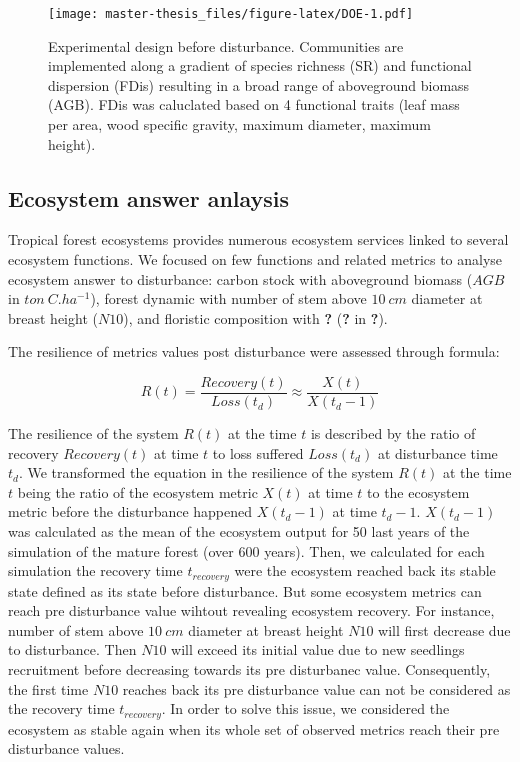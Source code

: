 \documentclass[]{article}
\theoremstyle{definition}
\theoremstyle{definition}
\theoremstyle{remark}
\begin{document}
\begin{figure}[htbp]
\centering
\texttt{[image: master-thesis\_files/figure-latex/DOE-1.pdf]}
\caption{\label{fig:DOE}Experimental design before disturbance. Communities
are implemented along a gradient of species richness (SR) and functional
dispersion (FDis) resulting in a broad range of aboveground biomass
(AGB). FDis was caluclated based on 4 functional traits (leaf mass per
area, wood specific gravity, maximum diameter, maximum height).}
\end{figure}

\subsection{Ecosystem answer anlaysis}\label{ecosystem-answer-anlaysis}

Tropical forest ecosystems provides numerous ecosystem services linked
to several ecosystem functions. We focused on few functions and related
metrics to analyse ecosystem answer to disturbance: carbon stock with
aboveground biomass (\(AGB\) in \(ton~C.ha^{-1}\)), forest dynamic with
number of stem above \(10~cm\) diameter at breast height (\(N10\)), and
floristic composition with \textbf{?} (\textbf{?} in \textbf{?}).

The resilience of metrics values post disturbance were assessed through
\citet{Henry2012} formula:

\begin{equation}
  R\left(t\right)=\frac{Recovery\left(t\right)}{Loss\left(t_d\right)} \approx \frac{X(t)}{X(t_d-1)}
  \label{eq:Resilience}
\end{equation}

The resilience of the system \(R(t)\) at the time \(t\) is described by
the ratio of recovery \(Recovery(t)\) at time \(t\) to loss suffered
\(Loss(t_d)\) at disturbance time \(t_d\). We transformed the equation
in the resilience of the system \(R(t)\) at the time \(t\) being the
ratio of the ecosystem metric \(X(t)\) at time \(t\) to the ecosystem
metric before the disturbance happened \(X(t_d-1)\) at time \(t_d-1\).
\(X(t_d-1)\) was calculated as the mean of the ecosystem output for 50
last years of the simulation of the mature forest (over 600 years).
Then, we calculated for each simulation the recovery time
\(t_{recovery}\) were the ecosystem reached back its stable state
defined as its state before disturbance. But some ecosystem metrics can
reach pre disturbance value wihtout revealing ecosystem recovery. For
instance, number of stem above \(10~cm\) diameter at breast height
\(N10\) will first decrease due to disturbance. Then \(N10\) will exceed
its initial value due to new seedlings recruitment before decreasing
towards its pre disturbanec value. Consequently, the first time \(N10\)
reaches back its pre disturbance value can not be considered as the
recovery time \(t_{recovery}\). In order to solve this issue, we
considered the ecosystem as stable again when its whole set of observed
metrics reach their pre disturbance values.
\end{document}
